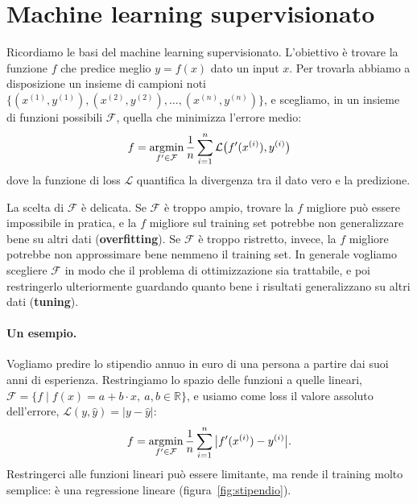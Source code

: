 \section{Machine learning supervisionato}\label{sec:ml}
Ricordiamo le basi del machine learning supervisionato. L'obiettivo è trovare la funzione $f$ che predice meglio $y = f(x)$ dato un input $x$. Per trovarla abbiamo a disposizione un insieme di campioni noti $\{(x^{(1)}, y^{(1)}), (x^{(2)}, y^{(2)}), \dots, (x^{(n)}, y^{(n)})\}$, e scegliamo, in un insieme di funzioni possibili $\mathcal{F}$, quella che minimizza l'errore medio:
\begin{equation}
f = \operatorname*{argmin}_{f' \in \mathcal{F}} \frac{1}{n} \sum_{i=1}^{n} \mathcal{L}\big(f'(x^{(i)}), y^{(i)}\big)
\end{equation}
dove la funzione di loss $\mathcal{L}$ quantifica la divergenza tra il dato vero e la predizione.

La scelta di $\mathcal{F}$ è delicata. Se $\mathcal{F}$ è troppo ampio, trovare la $f$ migliore può essere impossibile in pratica, e la $f$ migliore sul training set potrebbe non generalizzare bene su altri dati (\textbf{overfitting}). Se $\mathcal{F}$ è troppo ristretto, invece, la $f$ migliore potrebbe non approssimare bene nemmeno il training set. In generale vogliamo scegliere $\mathcal{F}$ in modo che il problema di ottimizzazione sia trattabile, e poi restringerlo ulteriormente guardando quanto bene i risultati generalizzano su altri dati (\textbf{tuning}).

\paragraph{Un esempio.} Vogliamo predire lo stipendio annuo in euro di una persona a partire dai suoi anni di esperienza. Restringiamo lo spazio delle funzioni a quelle lineari, $\mathcal{F} = \{f \mid f(x) = a + b \cdot x,\ a, b \in \mathbb{R}\}$, e usiamo come loss il valore assoluto dell'errore, $\mathcal{L}(y, \hat{y}) = |y - \hat{y}|$:
\begin{equation}
f = \operatorname*{argmin}_{f' \in \mathcal{F}} \frac{1}{n} \sum_{i=1}^{n} \big|f'(x^{(i)}) - y^{(i)}\big|.
\end{equation}
Restringerci alle funzioni lineari può essere limitante, ma rende il training molto semplice: è una regressione lineare (figura~\ref{fig:stipendio}).

